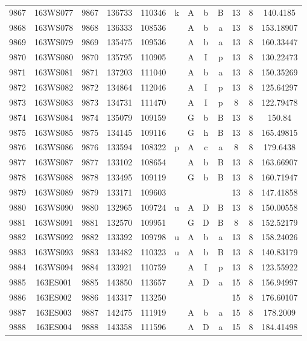 \begin{tabular}{|*{12}{c|}}
9867 & 163WS077 & 9867 & 136733 & 110346 & k & A & b & B & 13 & 8 & 140.4185 \\ 
9868 & 163WS078 & 9868 & 136333 & 108536 &  & A & b & a & 13 & 8 & 153.18907 \\ 
9869 & 163WS079 & 9869 & 135475 & 109536 &  & A & b & a & 13 & 8 & 160.33447 \\ 
9870 & 163WS080 & 9870 & 135795 & 110905 &  & A & I & p & 13 & 8 & 130.22473 \\ 
9871 & 163WS081 & 9871 & 137203 & 111040 &  & A & b & a & 13 & 8 & 150.35269 \\ 
9872 & 163WS082 & 9872 & 134864 & 112046 &  & A & I & p & 13 & 8 & 125.64297 \\ 
9873 & 163WS083 & 9873 & 134731 & 111470 &  & A & I & p & 8 & 8 & 122.79478 \\ 
9874 & 163WS084 & 9874 & 135079 & 109159 &  & G & b & B & 13 & 8 & 150.84 \\ 
9875 & 163WS085 & 9875 & 134145 & 109116 &  & G & h & B & 13 & 8 & 165.49815 \\ 
9876 & 163WS086 & 9876 & 133594 & 108322 & p & A & c & a & 8 & 8 & 179.6438 \\ 
9877 & 163WS087 & 9877 & 133102 & 108654 &  & A & b & B & 13 & 8 & 163.66907 \\ 
9878 & 163WS088 & 9878 & 133495 & 109119 &  & G & b & B & 13 & 8 & 160.71947 \\ 
9879 & 163WS089 & 9879 & 133171 & 109603 &  &  &  &  & 13 & 8 & 147.41858 \\ 
9880 & 163WS090 & 9880 & 132965 & 109724 & u & A & D & B & 13 & 8 & 150.00558 \\ 
9881 & 163WS091 & 9881 & 132570 & 109951 &  & G & D & B & 8 & 8 & 152.52179 \\ 
9882 & 163WS092 & 9882 & 133392 & 109798 & u & A & b & a & 13 & 8 & 158.24026 \\ 
9883 & 163WS093 & 9883 & 133482 & 110323 & u & A & b & B & 13 & 8 & 140.83179 \\ 
9884 & 163WS094 & 9884 & 133921 & 110759 &  & A & I & p & 13 & 8 & 123.55922 \\ 
9885 & 163ES001 & 9885 & 143850 & 113657 &  & A & D & a & 15 & 8 & 156.94997 \\ 
9886 & 163ES002 & 9886 & 143317 & 113250 &  &  &  &  & 15 & 8 & 176.60107 \\ 
9887 & 163ES003 & 9887 & 142475 & 111919 &  & A & b & a & 15 & 8 & 178.2009 \\ 
9888 & 163ES004 & 9888 & 143358 & 111596 &  & A & D & a & 15 & 8 & 184.41498 \\ 

\end{tabular}
